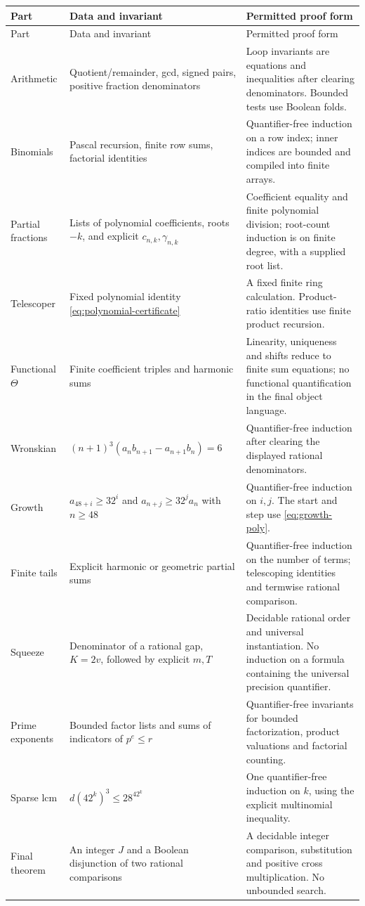 \documentclass[11pt]{article}
\theoremstyle{definition}\newtheorem{definition}[theorem]{Definition}
\theoremstyle{remark}\newtheorem{remark}[theorem]{Remark}
\begin{document}
\begin{longtable}{@{}p{.21\linewidth}p{.36\linewidth}p{.35\linewidth}@{}}
\toprule
Part & Data and invariant & Permitted proof form\\\midrule
\endfirsthead
\toprule Part & Data and invariant & Permitted proof form\\\midrule\endhead
Arithmetic & Quotient/remainder, gcd, signed pairs, positive fraction
denominators & Loop invariants are equations and inequalities after clearing
denominators. Bounded tests use Boolean folds.\\
Binomials & Pascal recursion, finite row sums, factorial identities &
Quantifier-free induction on a row index; inner indices are bounded and
compiled into finite arrays.\\
Partial fractions & Lists of polynomial coefficients, roots $-k$, and
explicit $c_{n,k},\gamma_{n,k}$ & Coefficient equality and finite polynomial
division; root-count induction is on finite degree, with a supplied root
list.\\
Telescoper & Fixed polynomial identity \eqref{eq:polynomial-certificate} &
A fixed finite ring calculation. Product-ratio identities use finite product
recursion.\\
Functional $\Theta$ & Finite coefficient triples and harmonic sums &
Linearity, uniqueness and shifts reduce to finite sum equations; no functional
quantification in the final object language.\\
Wronskian & $(n+1)^3(a_nb_{n+1}-a_{n+1}b_n)=6$ &
Quantifier-free induction after clearing the displayed rational denominators.\\
Growth & $a_{48+i}\ge32^i$ and
$a_{n+j}\ge32^ja_n$ with $n\ge48$ & Quantifier-free induction on $i,j$.
The start and step use \eqref{eq:growth-poly}.\\
Finite tails & Explicit harmonic or geometric partial sums &
Quantifier-free induction on the number of terms; telescoping identities and
termwise rational comparison.\\
Squeeze & Denominator of a rational gap, $K=2v$, followed by explicit
$m,T$ & Decidable rational order and universal instantiation. No induction on
a formula containing the universal precision quantifier.\\
Prime exponents & Bounded factor lists and sums of indicators of $p^e\le r$ &
Quantifier-free invariants for bounded factorization, product valuations and
factorial counting.\\
Sparse lcm & $d(42^k)^3\le28^{42^k}$ & One quantifier-free induction on $k$,
using the explicit multinomial inequality.\\
Final theorem & An integer $J$ and a Boolean disjunction of two rational
comparisons & A decidable integer comparison, substitution and positive
cross multiplication. No unbounded search.\\
\bottomrule
\end{longtable}
\end{document}
